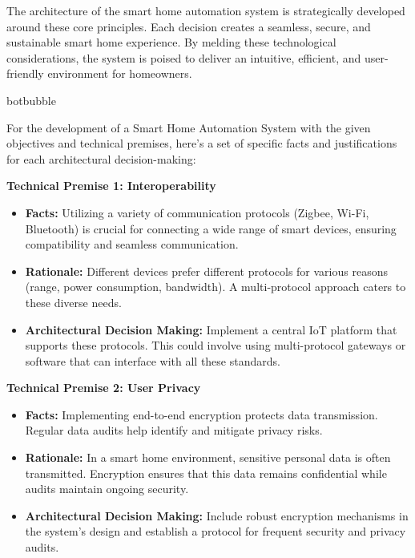 The architecture of the smart home automation system is strategically developed
around these core principles. Each decision creates a
seamless, secure, and sustainable smart home experience. By melding these technological considerations, the system is poised to deliver an intuitive, efficient, and user-friendly environment for homeowners.

\begin{chatout}{botbubble}{}

For the development of a Smart Home Automation System with the given objectives and technical premises, here's a set of specific facts and justifications for each architectural decision-making:

\noindent
\textbf{Technical Premise 1: Interoperability}

\begin{itemize}
    \item \textbf{Facts:} Utilizing a variety of communication protocols (Zigbee, Wi-Fi, Bluetooth) is crucial for connecting a wide range of smart devices, ensuring compatibility and seamless communication.
    \item \textbf{Rationale: }Different devices prefer different protocols for various reasons (range, power consumption, bandwidth). A multi-protocol approach caters to these diverse needs.
    \item \textbf{Architectural Decision Making:} Implement a central IoT platform that supports these protocols. This could involve using multi-protocol gateways or software that can interface with all these standards.    
\end{itemize}
\noindent
\textbf{Technical Premise 2: User Privacy}
\begin{itemize}
    \item \textbf{Facts:} Implementing end-to-end encryption protects data transmission. Regular data audits help identify and mitigate privacy risks.
    \item \textbf{Rationale:} In a smart home environment, sensitive personal data is often transmitted. Encryption ensures that this data remains confidential while audits maintain ongoing security.
    \item \textbf{Architectural Decision Making:} Include robust encryption mechanisms in the system's design and establish a protocol for frequent security and privacy audits.
\end{itemize}


\end{chatout}
